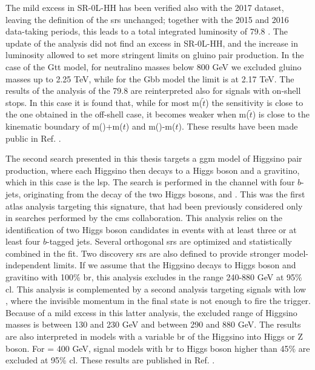 The mild excess in SR-0L-HH has been verified also with the 2017 dataset,
leaving the definition of the \glspl{sr} unchanged; 
together with the 2015 and 2016 data-taking periods, this leads to a total integrated luminosity 
of 79.8 \ifb. 
The update of the analysis did not find an excess in SR-0L-HH, and the increase in luminosity 
allowed to set more stringent limits on gluino pair production. 
In the case of the Gtt model, for neutralino masses below 800 GeV we excluded gluino masses up to 
2.25 TeV, while for the Gbb model the limit is at 2.17 TeV. 
The results of the analysis of the 79.8 \ifb are reinterpreted also for signals with on-shell 
stops. In this case it is found that, while for most m($\tilde{t}$) the sensitivity 
is close to the one obtained in the off-shell case, it becomes weaker 
when m($\tilde{t}$) is close to the kinematic boundary of 
m(\ninoone)+m($t$) and m(\gluino)-m($t$).  
These results have been made public in Ref. \cite{ATLAS-CONF-2018-041}.


The second search presented in this thesis targets a \gls{ggm} model of Higgsino pair production, 
where each Higgsino then decays to a Higgs boson and 
a gravitino, which in this case is the \gls{lsp}. The search is performed in the channel with four $b$-jets, originating from 
the decay of the two Higgs bosons, and \met. 
This was the first \gls{atlas} analysis targeting this signature, that had been 
previously considered only in searches performed by the \gls{cms} collaboration.
This analysis relies on the identification of two Higgs boson candidates in events with at least three or 
at least four $b$-tagged jets. Several orthogonal \glspl{sr} are optimized and statistically combined in the fit. 
Two discovery \glspl{sr} are also defined to provide stronger model-independent limits. 
If we assume that the Higgsino decays to Higgs boson and gravitino with 100\% \gls{br}, 
this analysis excludes \mhino in the range 240-880 GeV at 95\% \gls{cl}. 
This analysis is complemented by a second analysis targeting signals with low \mhino, where the 
invisible momentum in the final state is not enough to fire the \met trigger. 
Because of a mild excess in this latter analysis, the excluded range of Higgsino masses is 
between 130 and 230 GeV and between 290 and 880 GeV.
The results are also interpreted in models with a variable \gls{br} of the Higgsino into Higgs or Z boson. 
For \mhino = 400 GeV, signal models with \gls{br} to Higgs boson higher than 45\% are 
excluded at 95\% \gls{cl}.
These results are published in Ref. \cite{Aaboud:2018htj}. 






